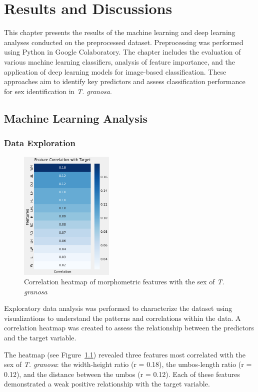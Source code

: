 
\chapter{Results and Discussions}
This chapter presents the results of the machine learning and deep learning analyses conducted on the preprocessed dataset. Preprocessing was performed using Python in Google Colaboratory. The chapter includes the evaluation of various machine learning classifiers, analysis of feature importance, and the application of deep learning models for image-based classification. These approaches aim to identify key predictors and assess classification performance for sex identification in \textit{T. granosa}.

\section{Machine Learning Analysis}
\subsection{Data Exploration}

\begin{figure}[!htbp]
	\centering
	\includegraphics[width=0.4\textwidth]{figures/heatmap.png}
	\caption{Correlation heatmap of morphometric features with the sex of \textit{T. granosa}}
	\label{fig:heatmap}
\end{figure}

Exploratory data analysis was performed to characterize the dataset using visualizations to understand the patterns and correlations within the data. A correlation heatmap was created to assess the relationship between the predictors and the target variable.

The heatmap (see Figure~\ref{fig:heatmap}) revealed three features most correlated with the sex of \textit{T. granosa}: the width-height ratio (r = 0.18), the umbos-length ratio (r = 0.12), and the distance between the umbos (r = 0.12). Each of these features demonstrated a weak positive relationship with the target variable. 

